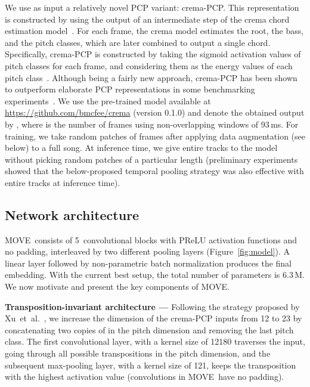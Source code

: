 \documentclass[letterpaper]{article}
\newcommand{\modelname}{MOVE}
\begin{document}
We use as input a relatively novel PCP variant: crema-PCP. This representation is constructed by using the output of an intermediate step of the crema chord estimation model~\cite{mcfee2017structured}. For each frame, the crema model estimates the root, the bass, and the pitch classes, which are later combined to output a single chord. Specifically, crema-PCP is constructed by taking the sigmoid activation values of pitch classes for each frame, and considering them as the energy values of each pitch class~\cite{mcfee2017structured}. Although being a fairly new approach, crema-PCP has been shown to outperform elaborate PCP representations in some benchmarking experiments~\cite{yesiler2019}. We use the pre-trained model available at \url{https://github.com/bmcfee/crema} (version 0.1.0) and denote the obtained output by , where  is the number of frames using non-overlapping windows of 93\,ms. For training, we take random patches of  frames after applying data augmentation (see below) to a full song. At inference time, we give entire tracks to the model without picking random patches of a particular length (preliminary experiments showed that the below-proposed temporal pooling strategy was also effective with entire tracks at inference time).

\subsection{Network architecture}
\label{sec:architect}

\modelname\ consists of 5~convolutional blocks with PReLU activation functions and no padding, interleaved by two different pooling layers (Figure~\ref{fig:model}). A linear layer followed by non-parametric batch normalization produces the final embedding. With the current best setup, the total number of parameters is 6.3\,M. We now motivate and present the key components of \modelname.

\noindent
\textbf{Transposition-invariant architecture ---} Following the strategy proposed by Xu~et~al.~\cite{xu2018}, we increase the dimension of the crema-PCP inputs  from 12 to 23 by concatenating two copies of  in the pitch dimension and removing the last pitch class. The first convolutional layer, with a kernel size of 12180 traverses the input, going through all possible transpositions in the pitch dimension, and the subsequent max-pooling layer, with a kernel size of 121, keeps the transposition with the highest activation value (convolutions in \modelname\ have no padding). 
\end{document}
